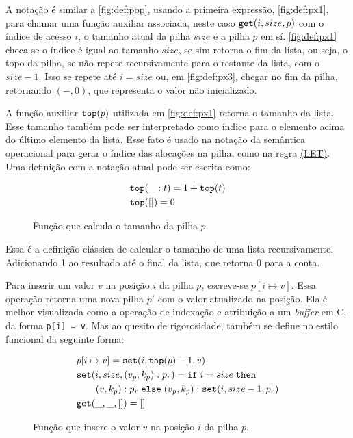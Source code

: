 A notação é similar a \ref{fig:def:pop}, usando a primeira expressão, \ref{fig:def:px1}, para chamar uma função auxiliar associada, neste caso $\texttt{get}(i, size, p)$ com o índice de acesso $i$, o tamanho atual da pilha $size$ e a pilha $p$ em sí. \ref{fig:def:px1} checa se o índice é igual ao tamanho $size$, se sim retorna o fim da lista, ou seja, o topo da pilha, se não repete recursivamente para o restante da lista, com o $size - 1$. Isso se repete até $i = size$ ou, em \ref{fig:def:px3}, chegar no fim da pilha, retornando $(-,0)$, que representa o valor não inicializado.

A função auxiliar $\texttt{top}(p)$ utilizada em \ref{fig:def:px1} retorna o tamanho da lista. Esse tamanho também pode ser interpretado como índice para o elemento acima do último elemento da lista. Esse fato é usado na notação da semântica operacional para gerar o índice das alocações na pilha, como na regra \hyperref[rule:let]{(LET)}. Uma definição com a notação atual pode ser escrita como:

\begin{figure}[ht]
	\begin{align}
	&\texttt{top}(\_ : t) = 1 + \texttt{top}(t) \label{fig:def:top1}\\
	&\texttt{top}([]) = 0 \label{fig:def:top2}
	\end{align}
	\caption{Função que calcula o tamanho da pilha $p$.}
	\label{fig:def:top}
\end{figure}

Essa é a definição clássica de calcular o tamanho de uma lista recursivamente. Adicionando 1 ao resultado até o final da lista, que retorna 0 para a conta.

Para inserir um valor $v$ na posição $i$ da pilha $p$, escreve-se $p[i \mapsto v]$. Essa operação retorna uma nova pilha $p'$ com o valor atualizado na posição. Ela é melhor visualizada como a operação de indexação e atribuição a um \emph{buffer} em C, da forma \lstinline[language=C]|p[i] = v|. Mas ao quesito de rigorosidade, também se define no estilo funcional da seguinte forma:

\begin{figure}[ht]
	\begin{align}
	&p[i \mapsto v] = \texttt{set}(i, \texttt{top}(p) - 1, v) \label{fig:def:set1}\\
	&\texttt{set}(i, size, (v_p, k_p) : p_r) = \texttt{if}\;i = size \;\texttt{then} \nonumber\\ 
	&\quad\quad(v, k_p) : p_r\;\texttt{else}\;(v_p, k_p) : \texttt{set}(i, size - 1, p_r) \label{fig:def:set2}\\
	&\texttt{get}(\_, \_, []) = [] \label{fig:def:set3}
	\end{align}
	\caption{Função que insere o valor $v$ na posição $i$ da pilha $p$.}
	\label{fig:def:set}
\end{figure}

